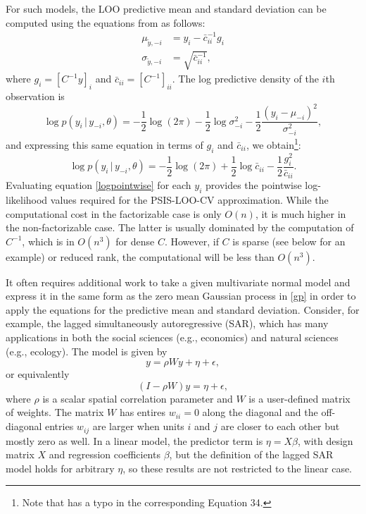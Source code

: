 \documentclass[11pt]{article}
\begin{document}
For such models, the LOO predictive mean and standard deviation can be computed
using the equations from \cite{sundararajan2001} as follows:
%
\begin{align}
\label{ypredpars}
  \mu_{\tilde{y},-i} &= y_i-\bar{c}_{ii}^{-1} g_i \nonumber \\
  \sigma_{\tilde{y},-i} &= \sqrt{\bar{c}_{ii}^{-1}},
\end{align}
%
where $g_i = \left[C^{-1} y\right]_i$ and
$\bar{c}_{ii} = \left[C^{-1}\right]_{ii}$.
The log predictive density of the $i$th observation is
%
\begin{equation}
  \log p(y_i \,|\, y_{-i},\theta)
  = - \frac{1}{2}\log(2\pi)
  - \frac{1}{2}\log \sigma^2_{-i}
  - \frac{1}{2}\frac{(y_i-\mu_{-i})^2}{\sigma^2_{-i}},
\end{equation}
%
and expressing this same equation in terms of $g_i$ and $\bar{c}_{ii}$, we
obtain\footnote{ Note that \cite{vehtari2016} has a typo in the corresponding
Equation 34.}:
%
\begin{equation}
\label{logpointwise}
  \log p(y_i \,|\, y_{-i},\theta)
  = - \frac{1}{2}\log(2\pi)
  + \frac{1}{2}\log \bar{c}_{ii}
  - \frac{1}{2}\frac{g_i^2}{\bar{c}_{ii}}.
\end{equation}
%
Evaluating equation \eqref{logpointwise} for each $y_i$ provides the pointwise
log-likelihood values required for the PSIS-LOO-CV approximation. 
While the computational cost in the factorizable case is only $O(n)$, 
it is much higher in the non-factorizable case. The latter is usually dominated by the 
computation of $C^{-1}$, which is in $O(n^3)$ for dense $C$. However, if $C$ is 
sparse (see below for an example) or reduced rank, the computational will be less than $O(n^3)$.

It often requires additional work to take a given multivariate normal
model and express it in the same form as the zero mean Gaussian process 
in \eqref{gp} in order to apply the equations for the predictive 
mean and standard deviation. Consider, for example, the lagged simultaneously 
autoregressive (SAR), which has many applications in both the social sciences 
(e.g., economics) and natural sciences (e.g., ecology). The model is given by 
%
\begin{equation}
y = \rho W y + \eta + \epsilon,
\end{equation}
%
or equivalently 
%
\begin{equation}
(I - \rho W) y = \eta + \epsilon,
\end{equation}
%
where $\rho$ is a scalar spatial correlation parameter and $W$ is a user-defined matrix of weights. 
The matrix $W$ has entires $w_{ii} = 0$ along the diagonal and the off-diagonal entries $w_{ij}$
are larger when units $i$ and $j$ are closer to each other but mostly zero as well. In a linear model, 
the predictor term is $\eta = X \beta$, with design matrix $X$ and regression coefficients $\beta$,
but the definition of the lagged SAR model holds for arbitrary $\eta$, so 
these results are not restricted to the linear case.  
\end{document}
